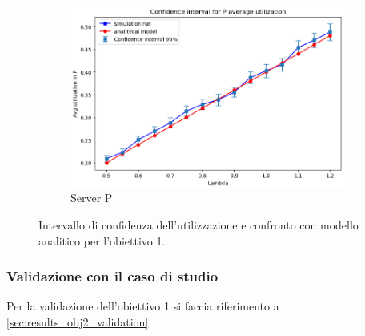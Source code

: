 \begin{figure}
\begin{subfigure}{0.49\linewidth}
        \label{fig:obj1_line_utilization_B}
    \end{subfigure}
    \begin{subfigure}{0.5\linewidth}
        \centering
        \includegraphics[width=\columnwidth]{figs/results/obj1/obj1-line-utilization-P.png}
        \caption{Server P}
        \label{fig:obj1_line_utilization_P}
    \end{subfigure}
    \caption{Intervallo di confidenza dell'utilizzazione e confronto con modello analitico per l'obiettivo 1.}
    \label{fig:obj1_lineplots_utilization}
\end{figure}

\subsubsection{Validazione con il caso di studio}
Per la validazione dell'obiettivo 1 si faccia riferimento a \autoref{sec:results_obj2_validation}

